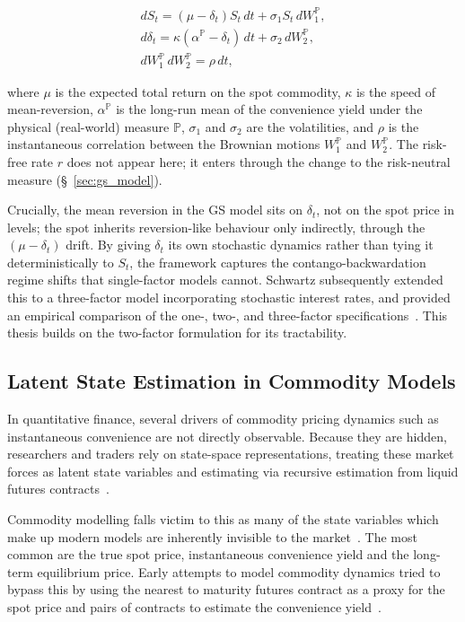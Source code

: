 \documentclass[11pt, a4paper]{article}
\begin{document}
\begin{gather} \label{eq: gibson_schwartz_physical}
dS_t = (\mu-\delta_t)S_t\,dt + \sigma_1 S_t\, dW_1^{\mathbb{P}}, \label{sde1} \\
d\delta_t = \kappa(\alpha^{\mathbb{P}}-\delta_t)\,dt + \sigma_2\, dW_2^{\mathbb{P}}, \label{sde2} \\
dW_1^{\mathbb{P}}\, dW_2^{\mathbb{P}} = \rho\, dt, \label{eq:gs_corr}
\end{gather}

where $\mu$ is the expected total return on the spot commodity, $\kappa$ is the speed of mean-reversion, $\alpha^{\mathbb{P}}$ is the long-run mean of the convenience yield under the physical (real-world) measure $\mathbb{P}$, $\sigma_1$ and $\sigma_2$ are the volatilities, and $\rho$ is the instantaneous correlation between the Brownian motions $W_1^{\mathbb{P}}$ and $W_2^{\mathbb{P}}$. The risk-free rate $r$ does not appear here; it enters through the change to the risk-neutral measure (\S~\ref{sec:gs_model}).

Crucially, the mean reversion in the GS model sits on $\delta_t$, not on the spot price in levels; the spot inherits reversion-like behaviour only indirectly, through the $(\mu-\delta_t)$ drift. By giving $\delta_t$ its own stochastic dynamics rather than tying it deterministically to $S_t$, the framework captures the contango-backwardation regime shifts that single-factor models cannot. Schwartz subsequently extended this to a three-factor model incorporating stochastic interest rates, and provided an empirical comparison of the one-, two-, and three-factor specifications~\cite{Schwartz1997TheHedging}. This thesis builds on the two-factor formulation for its tractability.

\subsection{Latent State Estimation in Commodity Models}
\label{sec:lit_estimation}

In quantitative finance, several drivers of commodity pricing dynamics such as instantaneous convenience are not directly observable. Because they are hidden, researchers and traders rely on state-space representations, treating these market forces as latent state variables and estimating via recursive 
estimation from liquid futures contracts~\cite{Ribeiro2004A}.


Commodity modelling falls victim to this as many of the state variables which make up modern models are inherently invisible to the market~\cite{Ribeiro2004A}. The most common are the true spot price, instantaneous convenience yield and the long-term equilibrium price. Early attempts to model commodity dynamics tried to bypass this by using the nearest to maturity futures contract as a proxy for the spot price and pairs of contracts to estimate the convenience yield~\cite{Schwartz1997TheHedging}.
\end{document}
